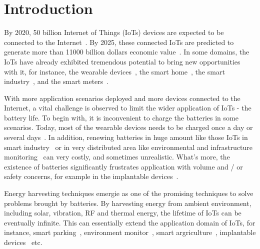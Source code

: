 \section{Introduction} \label{sec:introduction}
%
By 2020, 50 billion Internet of Things (IoTs) devices are expected to be connected to the Internet~\cite{nordrum2016popular,cisco2013IoT}.
By 2025, these connected IoTs are predicted to generate more than 11000 billion dollars economic value~\cite{manyika2015unlocking}.
In some domains, the IoTs have already exhibited tremendous potential to bring new opportunities with it, for instance, 
the wearable devices~\cite{metcalf2016wearables}, the smart home~\cite{ho2016smart}, the smart industry~\cite{shariatzadeh2016integration}, and the smart meters~\cite{azariadi2016ecg,haghi2017wearable}.

With more application scenarios deployed and more devices connected to the Internet, a vital challenge is observed to limit
the wider application of IoTs - the battery life.
To begin with, it is inconvenient to charge the batteries in some scenarios. 
Today, most of the wearable devices needs to be charged once a day or several days~\cite{}.
In addition, renewing batteries in huge amount like those IoTs in smart industry~\cite{wang2016towards} or in very distributed area like environmental and infrastructure monitoring~\cite{} can
very costly, and sometimes unrealistic.
What's more, the existence of batteries significantly frustrates application with volume and / or safety concerns, for example in the implantable devices~\cite{}.

Energy harvesting techniques emergie as one of the promising techniques to solve problems brought by batteries. By harvesting energy from ambient environment, including
solar, vibration, RF and thermal energy, the lifetime of IoTs can be eventually infinite. This can essentially extend the application domain of IoTs, for instance,
smart parking~\cite{}, environment monitor~\cite{}, smart argriculture~\cite{}, implantable devices~\cite{} etc.

